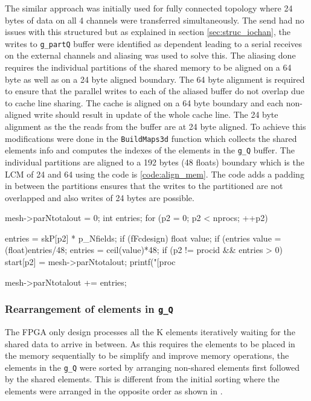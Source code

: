 The similar approach was initially used for fully connected topology where
24 bytes of data on all 4 channels were transferred simultaneously. The send had
no issues with this structured but as explained in section \ref{sec:struc_iochan},
the writes to \texttt{g\_partQ} buffer were identified as dependent leading
to a serial receives on the external channels and aliasing was used to solve this.
The aliasing done requires the individual partitions of the shared memory to be aligned
on a 64 byte as well as on a 24 byte aligned boundary. The 64 byte alignment is required
to ensure that the parallel writes to each of the aliased buffer do not overlap due to
cache line sharing. The cache is aligned on a 64 byte boundary and each non-aligned
write should result in update of the whole cache line. The 24 byte alignment as the
the reads from the buffer are at 24 byte aligned. To achieve this modifications
were done in the \texttt{BuildMaps3d} function which collects the shared elements info and computes
the indexes of the elements in the \texttt{g\_Q} buffer. The individual partitions
are aligned to a 192 bytes (48 floats) boundary which is the \ac{LCM} of 24 and 64 using the code
is \ref{code:align_mem}. The code adds a padding in between the partitions ensures
that the writes to the partitioned are not overlapped and also writes of 24 bytes are
possible.

\begin{CppCode}[caption=Alignment code introduced to ensure non-overlap writes of the
    aliased buffers, frame=tlrb, label=code:align_mem]
mesh->parNtotalout = 0;
int entries;
for (p2 = 0; p2 < nprocs; ++p2)
{
    entries = skP[p2] * p_Nfields;
    if (fFcdesign)
    {
        float value;
        if (entries%
        {
            value = (float)entries/48;
            entries = ceil(value)*48;
        }
        if (p2 != procid && entries > 0)
            start[p2] = mesh->parNtotalout;
            printf("[proc %
    }

    mesh->parNtotalout += entries;
}
\end{CppCode}

\subsubsection*{Rearrangement of elements in \texttt{g\_Q}}

The FPGA only design processes all the K elements iteratively waiting
for the shared data to arrive in between. As this requires the elements
to be placed in the memory sequentially to be simplify and improve memory
operations, the elements in the \texttt{g\_Q} were sorted by arranging
non-shared elements first followed by the shared elements. This is different
from the initial sorting where the elements were arranged in the opposite order
as shown in .

